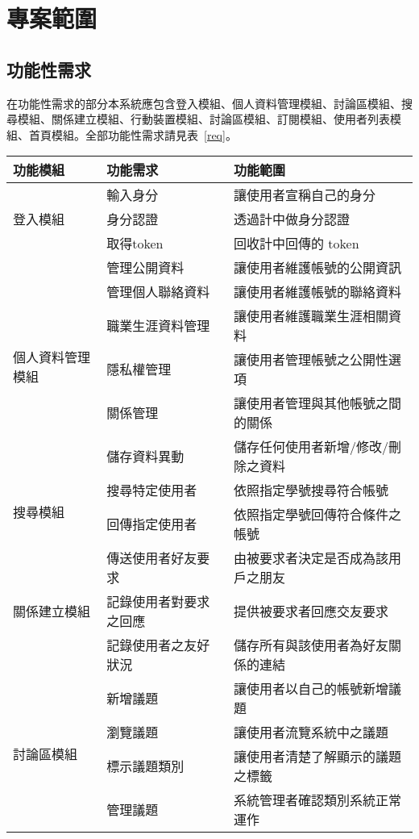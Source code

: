 \documentclass[11pt]{article}
\begin{document}
\section{專案範圍}

\subsection{功能性需求}
在功能性需求的部分本系統應包含登入模組、個人資料管理模組、討論區模組、搜尋模組、關係建立模組、行動裝置模組、討論區模組、訂閱模組、使用者列表模組、首頁模組。全部功能性需求請見表~\ref{req}。

\begin{table}[t]
\centering
\begin{tabular}{ | l | l | l | }
\hline
功能模組 & 功能需求 & 功能範圍 \\ \hline \hline
\multirow{3}{*}{登入模組}
& 輸入身分 & 讓使用者宣稱自己的身分\\
& 身分認證 & 透過計中做身分認證 \\
& 取得token & 回收計中回傳的 token \\ \hline
\multirow{6}{*}{個人資料管理模組}
& 管理公開資料 & 讓使用者維護帳號的公開資訊 \\
& 管理個人聯絡資料& 讓使用者維護帳號的聯絡資料\\
& 職業生涯資料管理& 讓使用者維護職業生涯相關資料 \\
& 隱私權管理& 讓使用者管理帳號之公開性選項 \\
& 關係管理& 讓使用者管理與其他帳號之間的關係 \\
& 儲存資料異動& 儲存任何使用者新增/修改/刪除之資料 \\ \hline
\multirow{2}{*}{搜尋模組}
& 搜尋特定使用者 & 依照指定學號搜尋符合帳號 \\
& 回傳指定使用者 & 依照指定學號回傳符合條件之帳號 \\ \hline
 \multirow{3}{*}{關係建立模組}
& 傳送使用者好友要求 & 由被要求者決定是否成為該用戶之朋友 \\
& 記錄使用者對要求之回應 & 提供被要求者回應交友要求 \\
& 記錄使用者之友好狀況 & 儲存所有與該使用者為好友關係的連結 \\ \hline
\multirow{4}{*}{討論區模組}
& 新增議題 & 讓使用者以自己的帳號新增議題 \\
& 瀏覽議題 & 讓使用者流覽系統中之議題 \\
& 標示議題類別 & 讓使用者清楚了解顯示的議題之標籤 \\
& 管理議題 & 系統管理者確認類別系統正常運作 \\ \hline

\end{tabular}
\end{table}
\end{document}
